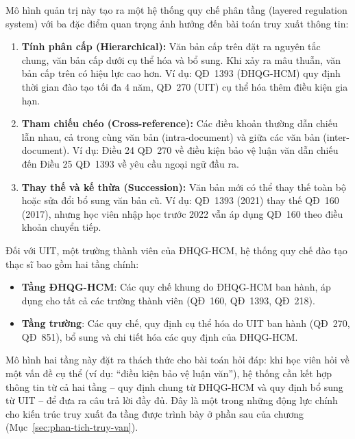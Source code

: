 Mô hình quản trị này tạo ra một hệ thống quy chế phân tầng (layered regulation
system) với ba đặc điểm quan trọng ảnh hưởng đến bài toán truy xuất thông tin:

\begin{enumerate}
  \item \textbf{Tính phân cấp (Hierarchical):} Văn bản cấp trên đặt ra nguyên tắc
        chung, văn bản cấp dưới cụ thể hóa và bổ sung. Khi xảy ra mâu thuẫn, văn
        bản cấp trên có hiệu lực cao hơn. Ví dụ: QĐ~1393 (ĐHQG-HCM) quy định thời
        gian đào tạo tối đa 4 năm, QĐ~270 (UIT) cụ thể hóa thêm điều kiện gia hạn.

  \item \textbf{Tham chiếu chéo (Cross-reference):} Các điều khoản thường dẫn chiếu
        lẫn nhau, cả trong cùng văn bản (intra-document) và giữa các văn bản
        (inter-document). Ví dụ: Điều 24 QĐ~270 về điều kiện bảo vệ luận văn dẫn
        chiếu đến Điều 25 QĐ~1393 về yêu cầu ngoại ngữ đầu ra.

  \item \textbf{Thay thế và kế thừa (Succession):} Văn bản mới có thể thay thế toàn
        bộ hoặc sửa đổi bổ sung văn bản cũ. Ví dụ: QĐ~1393 (2021) thay thế QĐ~160
        (2017), nhưng học viên nhập học trước 2022 vẫn áp dụng QĐ~160 theo điều khoản
        chuyển tiếp.
\end{enumerate}

Đối với UIT, một trường thành viên của ĐHQG-HCM, hệ thống quy chế đào tạo thạc sĩ
bao gồm hai tầng chính:
\begin{itemize}
    \item \textbf{Tầng ĐHQG-HCM}: Các quy chế khung do ĐHQG-HCM ban hành, áp dụng
          cho tất cả các trường thành viên (QĐ~160, QĐ~1393, QĐ~218).
    \item \textbf{Tầng trường}: Các quy chế, quy định cụ thể hóa do UIT ban hành
          (QĐ~270, QĐ~851), bổ sung và chi tiết hóa các quy định của ĐHQG-HCM.
\end{itemize}

Mô hình hai tầng này đặt ra thách thức cho bài toán hỏi đáp: khi học viên hỏi về
một vấn đề cụ thể (ví dụ: ``điều kiện bảo vệ luận văn''), hệ thống cần kết hợp
thông tin từ cả hai tầng -- quy định chung từ ĐHQG-HCM và quy định bổ sung từ UIT
-- để đưa ra câu trả lời đầy đủ. Đây là một trong những động lực chính cho kiến
trúc truy xuất đa tầng được trình bày ở phần sau của chương
(Mục~\ref{sec:phan-tich-truy-van}).

